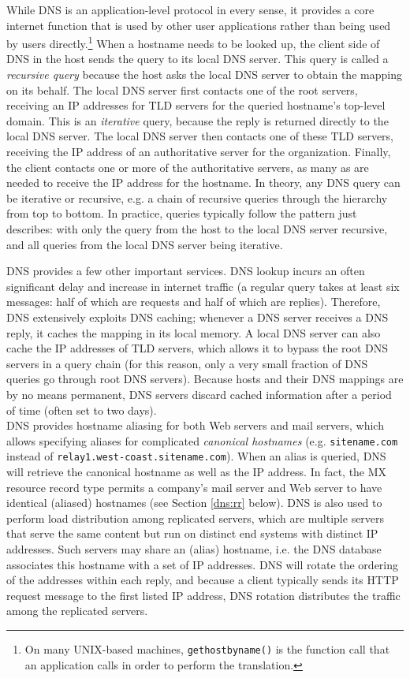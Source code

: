 \documentclass[8pt, table, xcdraw]{article}%
\begin{document}
While DNS is an application-level protocol in every sense, it provides a core internet function that is used by other user applications rather than being used by users directly.\footnote{On many UNIX-based machines, \texttt{gethostbyname()} is the function call that an application calls in order to perform the translation.} When a hostname needs to be looked up, the client side of DNS in the host sends the query to its local DNS server. This query is called a \emph{recursive query} because the host asks the local DNS server to obtain the mapping on its behalf. The local DNS server first contacts one of the root servers, receiving an IP addresses for TLD servers for the queried hostname's top-level domain. This is an \emph{iterative} query, because the reply is returned directly to the local DNS server. The local DNS server then contacts one of these TLD servers, receiving the IP address of an authoritative server for the organization. Finally, the client contacts one or more of the authoritative servers, as many as are needed to receive the IP address for the hostname. In theory, any DNS query can be iterative or recursive, e.g. a chain of recursive queries through the hierarchy from top to bottom. In practice, queries typically follow the pattern just describes: with only the query from the host to the local DNS server recursive, and all queries from the local DNS server being iterative.

DNS provides a few other important services. DNS lookup incurs an often significant delay and increase in internet traffic (a regular query takes at least six messages: half of which are requests and half of which are replies). Therefore, DNS extensively exploits DNS caching; whenever a DNS server receives a DNS reply, it caches the mapping in its local memory. A local DNS server can also cache the IP addresses of TLD servers, which allows it to bypass the root DNS servers in a query chain (for this reason, only a very small fraction of DNS queries go through root DNS servers). Because hosts and their DNS mappings are by no means permanent, DNS servers discard cached information after a period of time (often set to two days).\\
DNS provides hostname aliasing for both Web servers and mail servers, which allows specifying aliases for complicated \emph{canonical hostnames} (e.g. \texttt{sitename.com} instead of \texttt{relay1.west-coast.sitename.com}). When an alias is queried, DNS will retrieve the canonical hostname as well as the IP address. In fact, the MX resource record type permits a company's mail server and Web server to have identical (aliased) hostnames (see Section \ref{dns:rr} below). DNS is also used to perform load distribution among replicated servers, which are multiple servers that serve the same content but run on distinct end systems with distinct IP addresses. Such servers may share an (alias) hostname, i.e. the DNS database associates this hostname with a set of IP addresses. DNS will rotate the ordering of the addresses within each reply, and because a client typically sends its HTTP request message to the first listed IP address, DNS rotation distributes the traffic among the replicated servers.
\end{document}
